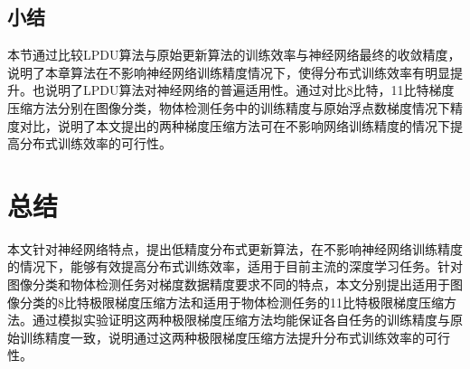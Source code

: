 \section{小结}
本节通过比较LPDU算法与原始更新算法的训练效率与神经网络最终的收敛精度，说明了本章算法在不影响神经网络训练精度情况下，使得分布式训练效率有明显提升。也说明了LPDU算法对神经网络的普遍适用性。通过对比8比特，11比特梯度压缩方法分别在图像分类，物体检测任务中的训练精度与原始浮点数梯度情况下精度对比，说明了本文提出的两种梯度压缩方法可在不影响网络训练精度的情况下提高分布式训练效率的可行性。

\chapter{总结}
本文针对神经网络特点，提出低精度分布式更新算法，在不影响神经网络训练精度的情况下，能够有效提高分布式训练效率，适用于目前主流的深度学习任务。针对图像分类和物体检测任务对梯度数据精度要求不同的特点，本文分别提出适用于图像分类的8比特极限梯度压缩方法和适用于物体检测任务的11比特极限梯度压缩方法。通过模拟实验证明这两种极限梯度压缩方法均能保证各自任务的训练精度与原始训练精度一致，说明通过这两种极限梯度压缩方法提升分布式训练效率的可行性。
